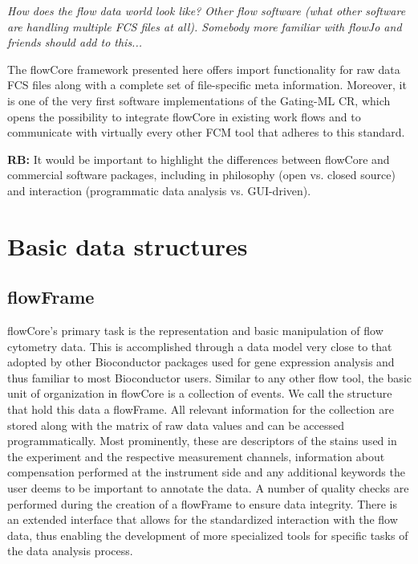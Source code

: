 \documentclass[12pt]{article}
\begin{document}
\textit{How does the flow data world look like? Other flow software
  (what other software are handling multiple FCS files at
  all). Somebody more familiar with flowJo and friends should add to
  this...}

The flowCore framework presented here offers import functionality for
raw data FCS files along with a complete set of file-specific meta information.
Moreover, it is one of the very first software implementations of the Gating-ML CR, 
which opens the possibility to integrate flowCore in existing work flows and to 
communicate with virtually every other FCM tool that adheres to this standard.


{\bf RB:}  It would be important to highlight
the differences between flowCore and commercial software packages,
including in philosophy (open vs. closed source) and interaction
(programmatic data analysis vs. GUI-driven). 



\section{Basic data structures}
\subsection{flowFrame}
flowCore's primary task is the representation and basic manipulation
of flow cytometry data. This is accomplished through a
data model very close to that adopted by other Bioconductor packages
used for gene expression analysis and thus familiar to most
Bioconductor users. Similar to any other flow tool, the basic unit of
organization in flowCore is a collection of events. We call the
structure that hold this data a flowFrame. All relevant information
for the collection are stored along with the matrix of raw data values
and can be accessed programmatically. Most prominently, these are
descriptors of the stains used in the experiment and the respective
measurement channels, information about compensation performed at the
instrument side and any additional keywords the user deems to be
important to annotate the data. A number of quality checks are
performed during the creation of a flowFrame to ensure data
integrity. There is an extended interface that allows for the
standardized interaction with the flow data, thus enabling the
development of more specialized tools for specific tasks of the data
analysis process.
\end{document}
